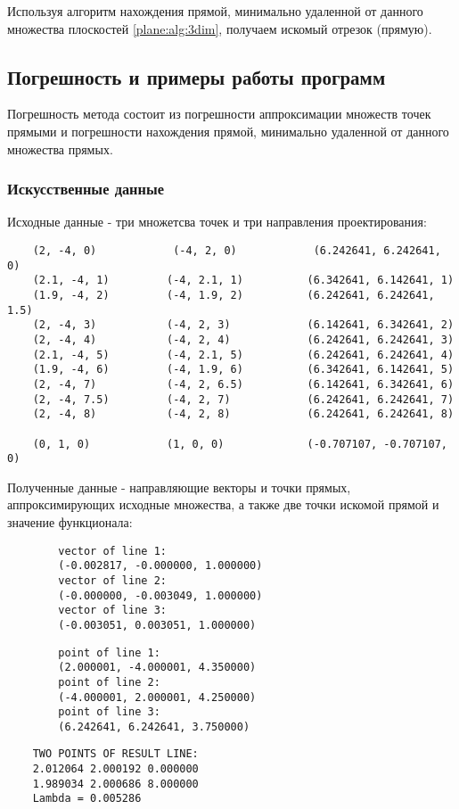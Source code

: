 Используя алгоритм нахождения прямой, минимально удаленной от данного множества плоскостей \ref{plane:alg:3dim}, получаем искомый отрезок (прямую).

\subsection{Погрешность и примеры работы программ}\label{math1:error}

Погрешность метода состоит из погрешности аппроксимации множеств точек прямыми и погрешности нахождения прямой, минимально удаленной от данного множества прямых.

\subsubsection{Искусственные данные}\label{math2:error:synth}

Исходные данные - три множетсва точек и три направления проектирования:

\begin{verbatim}
	(2, -4, 0)	          (-4, 2, 0)            (6.242641, 6.242641, 0)
	(2.1, -4, 1)         (-4, 2.1, 1)          (6.342641, 6.142641, 1)
	(1.9, -4, 2)         (-4, 1.9, 2)          (6.242641, 6.242641, 1.5)
	(2, -4, 3)           (-4, 2, 3)            (6.142641, 6.342641, 2)
	(2, -4, 4)           (-4, 2, 4)            (6.242641, 6.242641, 3)
	(2.1, -4, 5)         (-4, 2.1, 5)          (6.242641, 6.242641, 4)
	(1.9, -4, 6)         (-4, 1.9, 6)          (6.342641, 6.142641, 5)
	(2, -4, 7)           (-4, 2, 6.5)          (6.142641, 6.342641, 6)
	(2, -4, 7.5)         (-4, 2, 7)            (6.242641, 6.242641, 7)
	(2, -4, 8)           (-4, 2, 8)            (6.242641, 6.242641, 8)

	(0, 1, 0)            (1, 0, 0)             (-0.707107, -0.707107, 0)
\end{verbatim}

Полученные данные - направляющие векторы и точки прямых, аппроксимирующих исходные множества, а также две точки искомой прямой и значение функционала:

\begin{multicols}{2}
	\begin{verbatim}
		vector of line 1:
		(-0.002817, -0.000000, 1.000000)
		vector of line 2:
		(-0.000000, -0.003049, 1.000000)
		vector of line 3:
		(-0.003051, 0.003051, 1.000000)
	\end{verbatim}
	\columnbreak

	\begin{verbatim}
		point of line 1:
		(2.000001, -4.000001, 4.350000)
		point of line 2:
		(-4.000001, 2.000001, 4.250000)
		point of line 3:
		(6.242641, 6.242641, 3.750000)
\end{verbatim}
\end{multicols}
\begin{verbatim}
	TWO POINTS OF RESULT LINE:
	2.012064 2.000192 0.000000
	1.989034 2.000686 8.000000
	Lambda = 0.005286
\end{verbatim}

